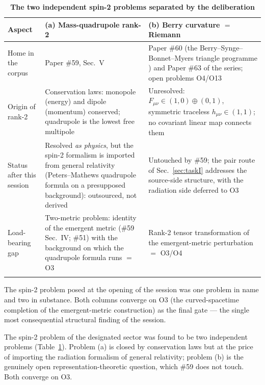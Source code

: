\documentclass[%
 reprint, amsmath,amssymb, aps, prb, ]{revtex4-2}
\numberwithin{equation}{section}
\begin{document}
\begin{table}[t!]
\centering
\caption{\textbf{The two independent spin-2 problems separated by the deliberation}}
\label{tab:split}
\renewcommand{\arraystretch}{1.4}
\begin{tabular}{p{2.6cm}p{6.2cm}p{6.2cm}}
\toprule
\textbf{Aspect} & \textbf{(a) Mass-quadrupole rank-2} & \textbf{(b) Berry curvature $=$ Riemann} \\
\midrule
Home in the corpus
& Paper \#59, Sec.~V
& Paper \#60 (the Berry--Synge--Bonnet--Myers triangle programme \cite{hanamura60}) and Paper \#63 of the series; open problems O4/O13 \\
\addlinespace[0.3cm]
Origin of rank-2
& Conservation laws: monopole (energy) and dipole (momentum) conserved; quadrupole is the lowest free multipole
& Unresolved: $F_{\mu\nu}\in(1,0)\oplus(0,1)$, symmetric traceless $h_{\mu\nu}\in(1,1)$; no covariant linear map connects them \\
\addlinespace[0.3cm]
Status after this session
& Resolved \emph{as physics}, but the spin-2 formalism is imported from general relativity (Peters--Mathews quadrupole formula on a presupposed background): outsourced, not derived
& Untouched by \#59; the pair route of Sec.~\ref{sec:taskI} addresses the source-side structure, with the radiation side deferred to O3 \\
\addlinespace[0.3cm]
Load-bearing gap
& Two-metric problem: identity of the emergent metric (\#59 Sec.~IV; \#51) with the background on which the quadrupole formula runs $=$ O3
& Rank-2 tensor transformation of the emergent-metric perturbation $=$ O3/O4 \\
\addlinespace[0.2cm]
\bottomrule
\end{tabular}
\vspace{0.2cm}
\begin{minipage}{0.95\textwidth}
\justifying\footnotesize
The spin-2 problem posed at the opening of the session was one problem in name and two in substance. Both columns converge on O3 (the curved-spacetime completion of the emergent-metric construction) as the final gate --- the single most consequential structural finding of the session.
\end{minipage}
\end{table}

The spin-2 problem of the designated sector was found to be two independent problems (Table~\ref{tab:split}). Problem (a) is closed by conservation laws but at the price of importing the radiation formalism of general relativity; problem (b) is the genuinely open representation-theoretic question, which \#59 does not touch. Both converge on O3.
\end{document}
